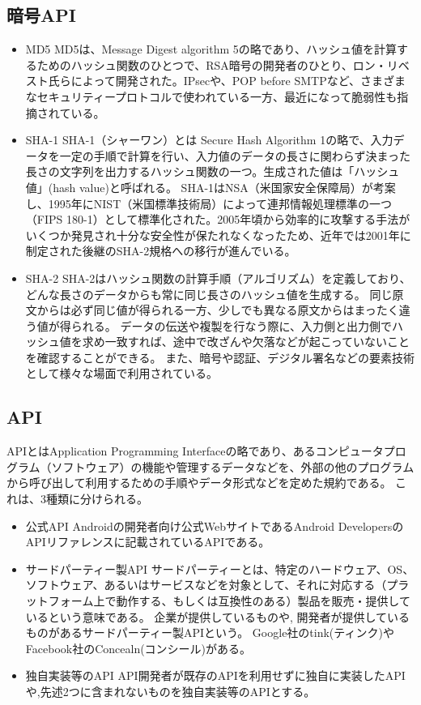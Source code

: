 \subsection{暗号API}
\begin{itemize}
\item MD5
MD5は、Message Digest algorithm 5の略であり、ハッシュ値を計算するためのハッシュ関数のひとつで、RSA暗号の開発者のひとり、ロン・リベスト氏らによって開発された。IPsecや、POP before SMTPなど、さまざまなセキュリティープロトコルで使われている一方、最近になって脆弱性も指摘されている。

\item SHA-1
SHA-1（シャーワン）とは Secure Hash Algorithm 1の略で、入力データを一定の手順で計算を行い、入力値のデータの長さに関わらず決まった長さの文字列を出力するハッシュ関数の一つ。生成された値は「ハッシュ値」(hash value)と呼ばれる。
SHA-1はNSA（米国家安全保障局）が考案し、1995年にNIST（米国標準技術局）によって連邦情報処理標準の一つ（FIPS 180-1）として標準化された。2005年頃から効率的に攻撃する手法がいくつか発見され十分な安全性が保たれなくなったため、近年では2001年に制定された後継のSHA-2規格への移行が進んでいる。

\item SHA-2
SHA-2はハッシュ関数の計算手順（アルゴリズム）を定義しており、どんな長さのデータからも常に同じ長さのハッシュ値を生成する。
同じ原文からは必ず同じ値が得られる一方、少しでも異なる原文からはまったく違う値が得られる。
データの伝送や複製を行なう際に、入力側と出力側でハッシュ値を求め一致すれば、途中で改ざんや欠落などが起こっていないことを確認することができる。
また、暗号や認証、デジタル署名などの要素技術として様々な場面で利用されている。　
\end{itemize}

\subsection{API}
APIとはApplication Programming Interfaceの略であり、あるコンピュータプログラム（ソフトウェア）の機能や管理するデータなどを、外部の他のプログラムから呼び出して利用するための手順やデータ形式などを定めた規約である。
これは、3種類に分けられる。
\begin{itemize}

\item 公式API
Androidの開発者向け公式WebサイトであるAndroid DevelopersのAPIリファレンスに記載されているAPIである。

\item サードパーティー製API
サードパーティーとは、特定のハードウェア、OS、ソフトウェア、あるいはサービスなどを対象として、それに対応する（プラットフォーム上で動作する、もしくは互換性のある）製品を販売・提供しているという意味である。
企業が提供しているものや, 開発者が提供しているものがあるサードパーティー製APIという。
Google社のtink(ティンク)やFacebook社のConcealn(コンシール)がある。


\item 独自実装等のAPI
API開発者が既存のAPIを利用せずに独自に実装したAPIや,先述2つに含まれないものを独自実装等のAPIとする。

\end{itemize}

